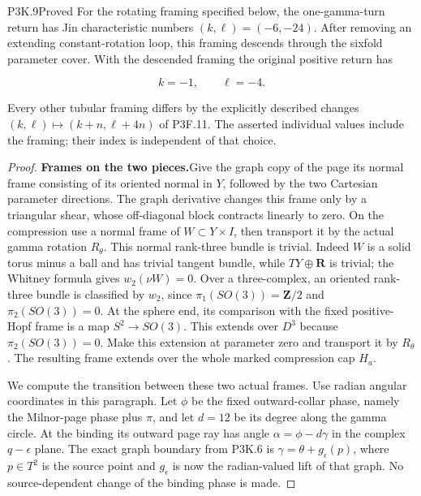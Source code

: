 \begin{statement}{P3K.9}{Proved}
For the rotating framing specified below, the one-gamma-turn
return has Jin characteristic numbers \((k,\ell)=(-6,-24)\).
After removing an extending constant-rotation loop, this framing
descends through the sixfold parameter cover.  With the descended
framing the original positive return has

\[
 k=-1,\qquad \ell=-4.
\]

Every other tubular framing differs by the explicitly described
changes \((k,\ell)\mapsto(k+n,\ell+4n)\) of P3F.11.  The asserted
individual values include the framing; their index is independent
of that choice.
\end{statement}

\begin{proof}
\par\medskip\noindent\textbf{Frames on the two pieces.}\enspace Give the graph copy of the page
its normal frame consisting of its oriented normal in \(Y\),
followed by the two Cartesian parameter directions.  The graph
derivative changes this frame only by a triangular shear, whose
off-diagonal block contracts linearly to zero.  On the compression
use a normal frame of \(W\subset Y\times I\), then transport it
by the actual gamma rotation \(R_\theta\).  This normal rank-three
bundle is trivial.  Indeed \(W\) is a solid torus minus a ball and
has trivial tangent bundle, while \(TY\oplus\mathbf R\) is trivial;
the Whitney formula gives \(w_2(\nu W)=0\).  Over a three-complex,
an oriented rank-three bundle is classified by \(w_2\), since
\(\pi_1(SO(3))=\mathbf Z/2\) and \(\pi_2(SO(3))=0\).
At the sphere end, its comparison with the fixed positive-Hopf
frame is a map \(S^2\to SO(3)\).  This extends over \(D^3\) because
\(\pi_2(SO(3))=0\).  Make this extension at parameter zero and
transport it by \(R_\theta\).  The resulting frame extends over
the whole marked compression cap \(H_a\).

We compute the transition between these two actual frames.  Use
radian angular coordinates in this paragraph.  Let \(\phi\) be
the fixed outward-collar phase, namely the Milnor-page phase plus
\(\pi\), and let \(d=12\) be its degree along the gamma circle.
At the binding its outward page ray has angle
\(\alpha=\phi-d\gamma\) in the complex \(q-\epsilon\) plane.
The exact graph boundary from P3K.6 is
\(\gamma=\theta+g_\epsilon(p)\), where
\(p\in T^2\) is the source point and \(g_\epsilon\) is now the
radian-valued lift of that graph.  No source-dependent change of
the binding phase is made.


\end{proof}
